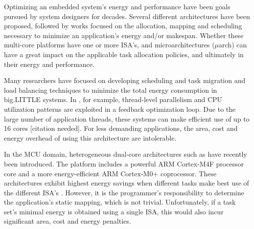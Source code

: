 Optimizing an embedded system's energy and performance have been goals pursued by system designers for decades. Several different architectures have been proposed, followed by works focused on the allocation, mapping and scheduling necessary to minimize an application's energy and/or makespan. Whether these multi-core platforms have one or more ISA's, and microarchitectures ($\mu $arch) can have a great impact on the applicable task allocation policies, and ultimately in their energy and performance. 

Many researchers have focused on developing scheduling and task migration and load balancing techniques to minimize the total energy consumption in big.LITTLE systems. In \cite{Kim2014, Sarma2015}, for example, thread-level parallelism and CPU utilization patterns are exploited in a feedback optimization loop. Due to the large number of application threads, these systems can make efficient use of up to 16 cores [citation needed]. For less demanding applications, the area, cost and energy overhead of using this architecture are intolerable.

In the MCU domain, heterogeneous dual-core architectures such as\cite{LPCXpresso54102} have recently been introduced. The platform includes a powerful ARM Cortex-M4F processor core and a more energy-efficient ARM Cortex-M0+ coprocessor. These architectures exhibit highest energy savings when different tasks make best use of the different ISA's \cite{Fuks}. However, it is the programmer's responsibility to determine the application's static mapping, which is not trivial. Unfortunately, if a task set's minimal energy is obtained using a single ISA, this would also incur significant area, cost and energy penalties. \par

